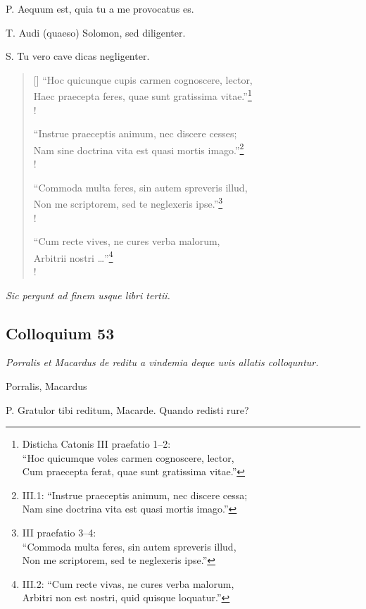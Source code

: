 \documentclass{article}
\begin{document}
P. Aequum est, quia tu a me provocatus es. 

T. Audi (quaeso) Solomon, sed diligenter. 

S. Tu vero cave dicas negligenter. 

\settowidth{\versewidth}{Hoc quicunque cupis carmen cognoscere, lector,}
\begin{verse}[\versewidth]
 ``Hoc quicunque cupis carmen cognoscere, lector,\\
Haec praecepta feres, quae sunt gratissima vitae.''\footnote{Disticha Catonis III praefatio 1--2:\\ ``Hoc quicumque voles carmen cognoscere, lector,\\ Cum praecepta ferat, quae sunt gratissima vitae.''}\\!

 ``Instrue praeceptis animum, nec discere cesses; \\
Nam sine doctrina vita est quasi mortis imago.''\footnote{III.1: ``Instrue praeceptis animum, nec discere cessa; \\ Nam sine doctrina vita est quasi mortis imago.''}\\!

 ``Commoda multa feres, sin autem spreveris illud, \\
Non me scriptorem, sed te neglexeris ipse.''\footnote{III praefatio 3--4:\\  ``Commoda multa feres, sin autem spreveris illud,\\ Non me scriptorem, sed te neglexeris ipse.''}\\!

 ``Cum recte vives, ne cures verba malorum, \\
Arbitrii nostri \ldots''\footnote{III.2: ``Cum recte vivas, ne cures verba malorum, \\Arbitri non est nostri, quid quisque loquatur.''}\\!
\end{verse}

\emph{Sic pergunt ad finem usque libri tertii.}

\subsection{Colloquium 53}
\emph{Porralis et Macardus de reditu a vindemia deque uvis allatis colloquntur.}

Porralis, Macardus

P. Gratulor tibi reditum, Macarde. Quando redisti rure?
\end{document}

